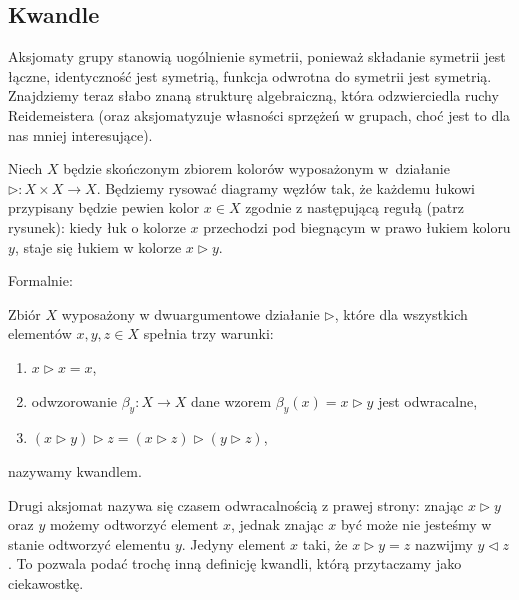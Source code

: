 \subsection{Kwandle}
Aksjomaty grupy stanowią uogólnienie symetrii, ponieważ składanie symetrii jest łączne, identyczność jest symetrią, funkcja odwrotna do symetrii jest symetrią.
Znajdziemy teraz słabo znaną strukturę algebraiczną, która odzwierciedla ruchy Reidemeistera (oraz aksjomatyzuje własności sprzężeń w grupach, choć jest to dla nas mniej interesujące).
%

Niech $X$ będzie skończonym zbiorem kolorów wyposażonym w~działanie $\triangleright \colon X \times X \to X$.
Będziemy rysować diagramy węzłów tak, że każdemu łukowi przypisany będzie pewien kolor $x \in X$ zgodnie z następującą regułą (patrz rysunek): kiedy łuk o kolorze $x$ przechodzi pod biegnącym w prawo łukiem koloru $y$, staje się łukiem w kolorze $x \triangleright y$.

Formalnie:

\begin{definition}[kwandel]
\label{def:quandle}%
%
    Zbiór $X$ wyposażony w dwuargumentowe działanie $\triangleright$, które dla wszystkich elementów $x, y, z \in X$ spełnia trzy warunki:
    \begin{enumerate}
        \item $x \triangleright x = x$,
        \item odwzorowanie $\beta_y \colon X \to X$ dane wzorem $\beta_y(x) = x \triangleright y$ jest odwracalne,
        \item $(x \triangleright y) \triangleright z = (x \triangleright z) \triangleright (y \triangleright z)$,
    \end{enumerate}
    nazywamy kwandlem.
\end{definition}

Drugi aksjomat nazywa się czasem odwracalnością z prawej strony: znając $x \triangleright y$ oraz $y$ możemy odtworzyć element $x$, jednak znając $x$ być może nie jesteśmy w stanie odtworzyć elementu $y$.
Jedyny element $x$ taki, że $x \triangleright y = z$ nazwijmy $y \triangleleft z$.
To pozwala podać trochę inną definicję kwandli, którą przytaczamy jako ciekawostkę.

